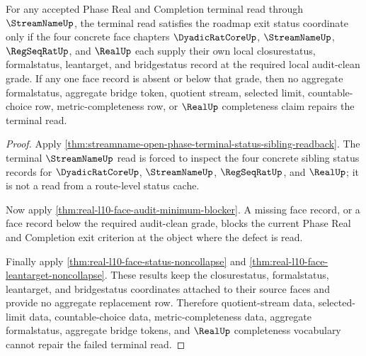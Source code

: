 \begin{theorem}
\label{thm:real-l10-streamname-terminal-status-minimality}
For any accepted Phase Real and Completion terminal read through
$\StreamNameUp$, the terminal read satisfies the roadmap exit status
coordinate only if the four concrete face chapters
$\DyadicRatCoreUp$, $\StreamNameUp$, $\RegSeqRatUp$, and $\RealUp$ each
supply their own local closurestatus, formalstatus, leantarget, and
bridgestatus record at the required local audit-clean grade. If any one face
record is absent or below that grade, then no aggregate formalstatus,
aggregate bridge token, quotient stream, selected limit, countable-choice
row, metric-completeness row, or $\RealUp$ completeness claim repairs the
terminal read.
\end{theorem}
\begin{proof}
Apply
\autoref{thm:streamname-open-phase-terminal-status-sibling-readback}. The
terminal $\StreamNameUp$ read is forced to inspect the four concrete sibling
status records for $\DyadicRatCoreUp$, $\StreamNameUp$, $\RegSeqRatUp$, and
$\RealUp$; it is not a read from a route-level status cache.

Now apply \autoref{thm:real-l10-face-audit-minimum-blocker}. A missing face
record, or a face record below the required audit-clean grade, blocks the
current Phase Real and Completion exit criterion at the object where the
defect is read.

Finally apply \autoref{thm:real-l10-face-status-noncollapse} and
\autoref{thm:real-l10-face-leantarget-noncollapse}. These results keep the
closurestatus, formalstatus, leantarget, and bridgestatus coordinates
attached to their source faces and provide no aggregate replacement row.
Therefore quotient-stream data, selected-limit data, countable-choice data,
metric-completeness data, aggregate formalstatus, aggregate bridge tokens,
and $\RealUp$ completeness vocabulary cannot repair the failed terminal
read.
\end{proof}

